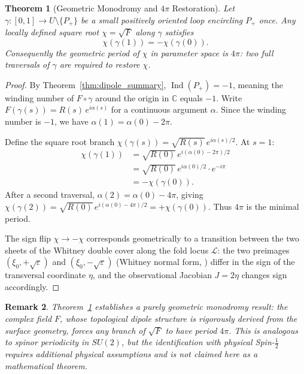 \documentclass[11pt]{article}
\DeclareMathOperator{\Ind}{Ind}
\newtheorem{theorem}{Theorem}[section]
\newtheorem{remark}[theorem]{Remark}
\begin{document}
\begin{theorem}[Geometric Monodromy and $4\pi$ Restoration]
\label{thm:monodromy}
Let $\gamma: [0,1] \to U \setminus \{P_+\}$ be a small positively oriented loop
encircling $P_+$ once.  Any locally defined square root $\chi = \sqrt{F}$ along
$\gamma$ satisfies
\[
  \chi(\gamma(1)) = -\chi(\gamma(0)).
\]
Consequently the geometric period of $\chi$ in parameter space is $4\pi$: two
full traversals of $\gamma$ are required to restore $\chi$.
\end{theorem}

\begin{proof}
By Theorem~\ref{thm:dipole_summary}, $\Ind(P_+) = -1$, meaning the winding number
of $F \circ \gamma$ around the origin in $\mathbb{C}$ equals $-1$.  Write
$F(\gamma(s)) = R(s)\,e^{i\alpha(s)}$ for a continuous argument $\alpha$.
Since the winding number is $-1$, we have $\alpha(1) = \alpha(0) - 2\pi$.

Define the square root branch $\chi(\gamma(s)) = \sqrt{R(s)}\,e^{i\alpha(s)/2}$.
At $s = 1$:
\begin{align*}
  \chi(\gamma(1))
  &= \sqrt{R(0)}\,e^{i(\alpha(0)-2\pi)/2}\\
  &= \sqrt{R(0)}\,e^{i\alpha(0)/2}\cdot e^{-i\pi}\\
  &= -\chi(\gamma(0)).
\end{align*}
After a second traversal, $\alpha(2) = \alpha(0) - 4\pi$, giving
$\chi(\gamma(2)) = \sqrt{R(0)}\,e^{i(\alpha(0)-4\pi)/2} = +\chi(\gamma(0))$.
Thus $4\pi$ is the minimal period.

The sign flip $\chi \to -\chi$ corresponds geometrically to a transition
between the two sheets of the Whitney double cover along the fold locus
$\mathcal{L}$: the two preimages $(\xi_0, +\sqrt{\varepsilon})$ and
$(\xi_0, -\sqrt{\varepsilon})$ (Whitney normal form, \cite{GolubitskiGuillemin1973})
differ in the sign of the transversal coordinate $\eta$, and the observational
Jacobian $J = 2\eta$ changes sign accordingly.
\end{proof}

\begin{remark}
Theorem~\ref{thm:monodromy} establishes a purely geometric monodromy result:
the complex field $F$, whose topological dipole structure is rigorously derived
from the surface geometry, forces any branch of $\sqrt{F}$ to have period $4\pi$.
This is \emph{analogous} to spinor periodicity in $SU(2)$, but the identification
with physical Spin-$\tfrac12$ requires additional physical assumptions and is not
claimed here as a mathematical theorem.
\end{remark}
\end{document}

